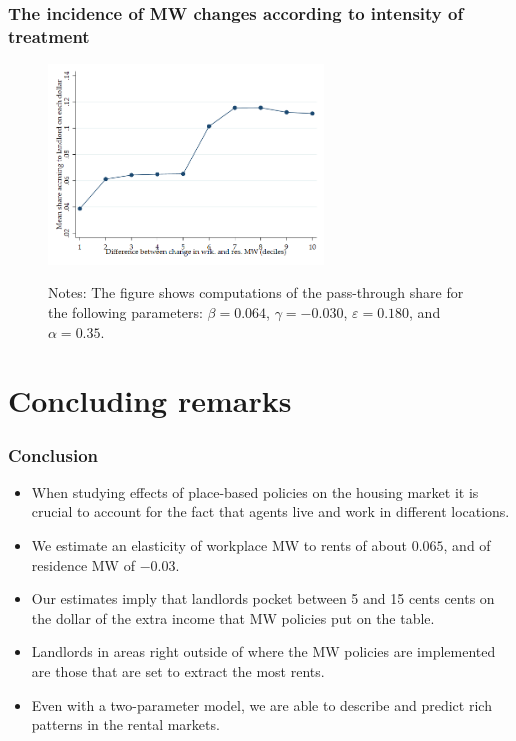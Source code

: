 \documentclass[aspectratio=169, t]{beamer}
\begin{document}
\begin{frame}
	\frametitle{The incidence of MW changes according to intensity of treatment}
	
	\begin{figure}
		\includegraphics[width = 0.65\textwidth]{counterfactuals/output/deciles_diff.png}
		\begin{minipage}{.95\textwidth} \footnotesize
			\vspace{2mm}
			Notes: The figure shows computations of the pass-through share for the following
			parameters: $\beta = 0.064$, $\gamma = -0.030$, $\varepsilon = 0.180$, and $\alpha=0.35$.
		\end{minipage}
	\end{figure}
\end{frame}

\section{Concluding remarks}

\begin{frame}
	\frametitle{Conclusion}
	
	\begin{itemize}
	    \item When studying effects of place-based policies on the housing market it is crucial
	     to account for the fact that agents live and work in different locations.
		 \vspace{1mm}
	     \item We estimate an elasticity of workplace MW to rents of about $0.065$, and of residence MW of $-0.03$.
		 \vspace{1mm}
	     \item Our estimates imply that landlords pocket between 5 and 15 cents cents on the dollar of the extra 
	     income that MW policies put on the table.
		 \vspace{1mm}
	     \item Landlords in areas right outside of where the MW policies are implemented are those that are set to extract the most rents. 
	     \item Even with a two-parameter model, we are able to describe and predict rich patterns in the rental markets.
	\end{itemize}
	
\end{frame}
\end{document}
